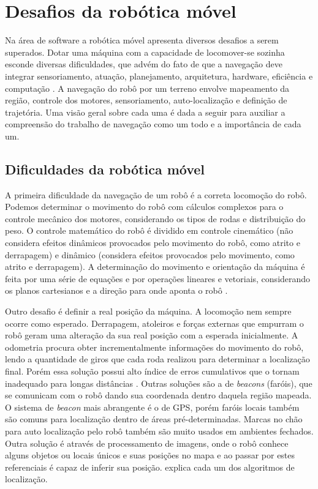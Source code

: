 \section{Desafios da robótica móvel}

Na área de software a robótica móvel apresenta diversos desafios a serem superados. Dotar uma máquina com a capacidade de locomover-se sozinha esconde diversas dificuldades, que advém do fato de que a navegação deve integrar sensoriamento, atuação, planejamento, arquitetura, hardware, eficiência e computação \cite{Souza2008}. A navegação do robô por um terreno envolve mapeamento da região, controle dos motores, sensoriamento, auto-localização e definição de trajetória. Uma visão geral sobre cada uma é dada a seguir para auxiliar a compreensão do trabalho de navegação como um todo e a importância de cada um.

\subsection{Dificuldades da robótica móvel}

A primeira dificuldade da navegação de um robô é a correta locomoção do robô. Podemos determinar o movimento do robô com cálculos complexos para o controle mecânico dos motores, considerando os tipos de rodas e distribuição do peso. O controle matemático do robô é dividido em controle cinemático (não considera efeitos dinâmicos provocados pelo movimento do robô, como atrito e derrapagem) e dinâmico (considera efeitos provocados pelo movimento, como atrito e derrapagem). A determinação do movimento e orientação da máquina é feita por uma série de equações e por operações lineares e vetoriais, considerando os planos cartesianos e a direção para onde aponta o robô \cite{Siegwart2004}.

Outro desafio é definir a real posição da máquina. A locomoção nem sempre ocorre como esperado. Derrapagem, atoleiros e forças externas que empurram o robô geram uma alteração da sua real posição com a esperada inicialmente. A odometria procura obter incrementalmente informações do movimento do robô, lendo a quantidade de giros que cada roda realizou para determinar a localização final. Porém essa solução possui alto índice de erros cumulativos que o tornam inadequado para longas distâncias \cite{Pereira2003}. Outras soluções são a de \textit{beacons} (faróis), que se comunicam com o robô dando sua coordenada dentro daquela região mapeada. O sistema de \textit{beacon} mais abrangente é o de GPS, porém faróis locais também são comuns para localização dentro de áreas pré-determinadas. Marcas no chão para auto localização pelo robô também são muito usados em ambientes fechados. Outra solução é através de processamento de imagens, onde o robô conhece alguns objetos ou locais únicos e suas posições no mapa e ao passar por estes referenciais é capaz de inferir sua posição. \cite{Borenstein1996} explica cada um dos algoritmos de localização.

